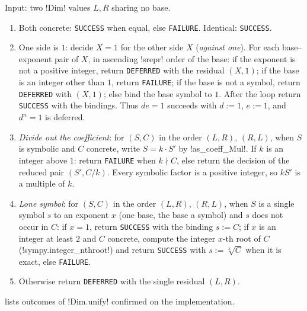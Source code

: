 \begin{algorithm}\label{alg:algebra-decide-reduced}
Input: two \py!Dim! values $L,R$ sharing no base.
\begin{enumerate}
\item Both concrete: \texttt{SUCCESS} when equal, else \texttt{FAILURE}. Identical: \texttt{SUCCESS}.
\item One side is $1$: decide $X=1$ for the other side $X$ (\emph{against one}). For each base--exponent pair of $X$, in ascending \py!srepr! order of the base: if the exponent is not a positive integer, return \texttt{DEFERRED} with the residual $(X,1)$; if the base is an integer other than $1$, return \texttt{FAILURE}; if the base is not a symbol, return \texttt{DEFERRED} with $(X,1)$; else bind the base symbol to $1$. After the loop return \texttt{SUCCESS} with the bindings. Thus $de=1$ succeeds with $d:=1$, $e:=1$, and $d^n=1$ is deferred.
\item \emph{Divide out the coefficient}: for $(S,C)$ in the order $(L,R)$, $(R,L)$, when $S$ is symbolic and $C$ concrete, write $S=k\cdot S'$ by \py!as_coeff_Mul!. If $k$ is an integer above $1$: return \texttt{FAILURE} when $k\nmid C$, else return the decision of the reduced pair $(S',C/k)$. Every symbolic factor is a positive integer, so $kS'$ is a multiple of $k$.
\item \emph{Lone symbol}: for $(S,C)$ in the order $(L,R)$, $(R,L)$, when $S$ is a single symbol $s$ to an exponent $x$ (one base, the base a symbol) and $s$ does not occur in $C$: if $x=1$, return \texttt{SUCCESS} with the binding $s:=C$; if $x$ is an integer at least $2$ and $C$ concrete, compute the integer $x$-th root of $C$ (\py!sympy.integer_nthroot!) and return \texttt{SUCCESS} with $s:=\sqrt[x]{C}$ when it is exact, else \texttt{FAILURE}.
\item Otherwise return \texttt{DEFERRED} with the single residual $(L,R)$.
\end{enumerate}
\end{algorithm}

 lists outcomes of \py!Dim.unify! confirmed on the implementation.


